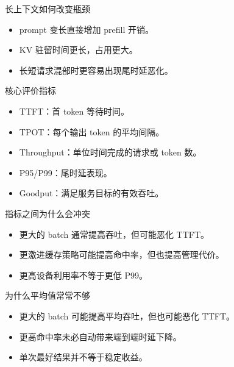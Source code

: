 \begin{frame}{长上下文如何改变瓶颈}
  \begin{itemize}
    \item prompt 变长直接增加 prefill 开销。
    \item KV 驻留时间更长，占用更大。
    \item 长短请求混部时更容易出现尾时延恶化。
  \end{itemize}
\end{frame}

\begin{frame}{核心评价指标}
  \begin{itemize}
    \item TTFT：首 token 等待时间。
    \item TPOT：每个输出 token 的平均间隔。
    \item Throughput：单位时间完成的请求或 token 数。
    \item P95/P99：尾时延表现。
    \item Goodput：满足服务目标的有效吞吐。
  \end{itemize}
\end{frame}

\begin{frame}{指标之间为什么会冲突}
  \begin{itemize}
    \item 更大的 batch 通常提高吞吐，但可能恶化 TTFT。
    \item 更激进缓存策略可能提高命中率，但也提高管理代价。
    \item 更高设备利用率不等于更低 P99。
  \end{itemize}
\end{frame}

\begin{frame}{为什么平均值常常不够}
  \begin{itemize}
    \item 更大的 batch 可能提高平均吞吐，但也可能恶化 TTFT。
    \item 更高命中率未必自动带来端到端时延下降。
    \item 单次最好结果并不等于稳定收益。
  \end{itemize}
\end{frame}


